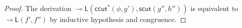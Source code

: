 \documentclass[sn-mathphys-num]{sn-jnl}%
\newcommand{\GG}{\Gamma}
\newcommand{\GD}{\Delta}
\newcommand{\vd}{\vdash}
\newcommand{\lolli}{\multimap}
\newcommand{\lleft}{{\lolli}\mathsf{L}}
\newcommand{\mf}[1]{\mathsf{#1}}
\newcommand{\scut}[2]{\mf{scut} (#1 , #2)}
\newcommand{\iccut}[2]{\mf{ccut}^* (#1 , #2)}
\theoremstyle{thmstyleone}%
\theoremstyle{thmstyletwo}%
\theoremstyle{thmstylethree}%
\begin{document}
\begin{proof}
The derivation $\lleft (\iccut{\phi}{g'} , \scut{g''}{h''})$ is equivalent to $\lleft (f' , f'')$ by inductive hypothesis and congruence.


\end{proof}
\end{document}
